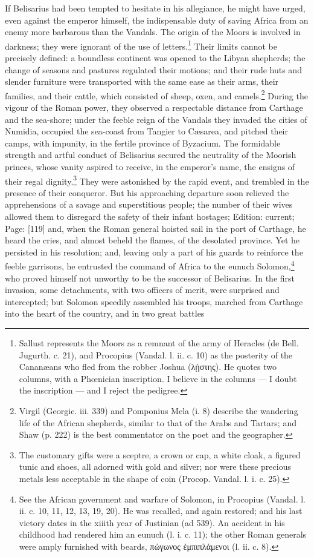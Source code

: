 If Belisarius had been tempted to hesitate in his allegiance, he might have urged, even against the emperor himself, the indispensable duty of saving Africa from an enemy more barbarous than the Vandals. The origin of the Moors is involved in darkness; they were ignorant of the use of letters.\footnote{Sallust represents the Moors as a remnant of the army of Heracles (de Bell. Jugurth. c. 21), and Procopius (Vandal. l. ii. c. 10) as the posterity of the Cananæans who fled from the robber Joshua (\textgreek{λ\texthebrew{ῄ}στης}). He quotes two columns, with a Phœnician inscription. I believe in the columns \texthebrew{—} I doubt the inscription \texthebrew{—} and I reject the pedigree.} Their limits cannot be precisely defined: a boundless continent was opened to the Libyan shepherds; the change of seasons and pastures regulated their motions; and their rude huts and slender furniture were transported with the same ease as their arms, their families, and their cattle, which consisted of sheep, oxen, and camels.\footnote{Virgil (Georgic. iii. 339) and Pomponius Mela (i. 8) describe the wandering life of the African shepherds, similar to that of the Arabs and Tartars; and Shaw (p. 222) is the best commentator on the poet and the geographer.} During the vigour of the Roman power, they observed a respectable distance from Carthage and the sea-shore; under the feeble reign of the Vandals they invaded the cities of Numidia, occupied the sea-coast from Tangier to Cæsarea, and pitched their camps, with impunity, in the fertile province of Byzacium. The formidable strength and artful conduct of Belisarius secured the neutrality of the Moorish princes, whose vanity aspired to receive, in the emperor\texthebrew{}’s name, the ensigns of their regal dignity.\footnote{The customary gifts were a sceptre, a crown or cap, a white cloak, a figured tunic and shoes, all adorned with gold and silver; nor were these precious metals less acceptable in the shape of coin (Procop. Vandal. l. i. c. 25).} They were astonished by the rapid event, and trembled in the presence of their conqueror. But his approaching departure soon relieved the apprehensions of a savage and superstitious people; the number of their wives allowed them to disregard the safety of their infant hostages; Edition: current; Page: [119] and, when the Roman general hoisted sail in the port of Carthage, he heard the cries, and almost beheld the flames, of the desolated province. Yet he persisted in his resolution; and, leaving only a part of his guards to reinforce the feeble garrisons, he entrusted the command of Africa to the eunuch Solomon,\footnote{See the African government and warfare of Solomon, in Procopius (Vandal. l. ii. c. 10, 11, 12, 13, 19, 20). He was recalled, and again restored; and his last victory dates in the xiiith year of Justinian (ad 539). An accident in his childhood had rendered him an eunuch (l. i. c. 11); the other Roman generals were amply furnished with beards, \textgreek{πώγωνος \texthebrew{ἐ}μπιπλάμενοι} (l. ii. c. 8).} who proved himself not unworthy to be the successor of Belisarius. In the first invasion, some detachments, with two officers of merit, were surprised and intercepted; but Solomon speedily assembled his troops, marched from Carthage into the heart of the country, and in two great battles 